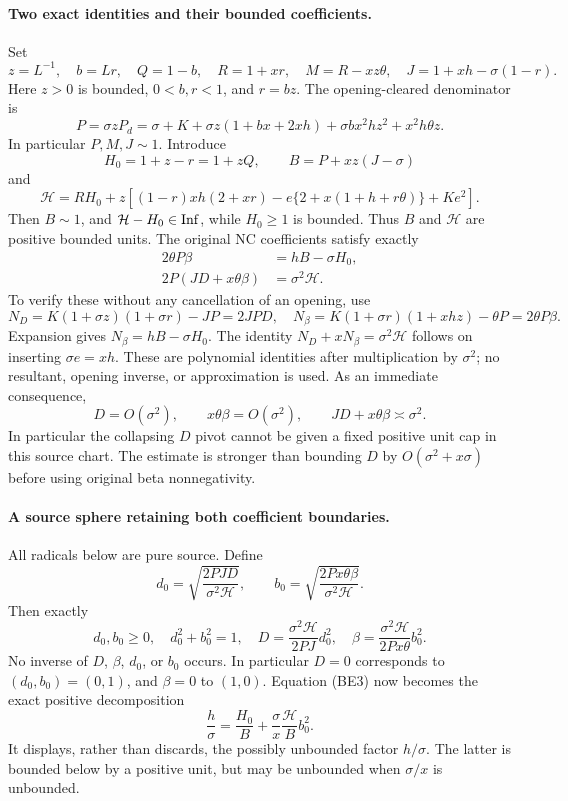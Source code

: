 \paragraph{Two exact identities and their bounded coefficients.}
Set
\[
 z=L^{-1},\quad b=Lr,\quad Q=1-b,\quad
 R=1+xr,\quad M=R-xz\theta,\quad J=1+xh-\sigma(1-r).
\]
Here $z>0$ is bounded, $0<b,r<1$, and $r=bz$.
The opening-cleared denominator is
\[
 P=\sigma zP_d
 =\sigma+K+\sigma z(1+bx+2xh)
   +\sigma bx^2hz^2+x^2h\theta z.
\]
In particular $P,M,J\sim1$. Introduce
\[
 H_0=1+z-r=1+zQ,\qquad B=P+xz(J-\sigma)
\]
and
\[
 \mathcal H=RH_0+z\left[(1-r)xh(2+xr)
 -e\{2+x(1+h+r\theta)\}+Ke^2\right].
 \tag{BE2}
\]
Then $B\sim1$, and $\mathcal H-H_0\in\operatorname{Inf}$, while $H_0\ge1$ is
bounded. Thus $B$ and $\mathcal H$ are positive bounded units.
The original NC coefficients satisfy exactly
\begin{align*}
 2\theta P\beta&=hB-\sigma H_0,                    \tag{BE3}\\
 2P(JD+x\theta\beta)&=\sigma^2\mathcal H.         \tag{BE4}
\end{align*}
To verify these without any cancellation of an opening, use
\[
 N_D=K(1+\sigma z)(1+\sigma r)-JP=2JPD,
 \quad
 N_\beta=K(1+\sigma r)(1+xhz)-\theta P=2\theta P\beta.
\]
Expansion gives $N_\beta=hB-\sigma H_0$. The identity
$N_D+xN_\beta=\sigma^2\mathcal H$ follows on inserting
$\sigma e=xh$. These are polynomial identities after multiplication
by $\sigma^2$; no resultant, opening inverse, or approximation is used.
As an immediate consequence,
\[
 D=O(\sigma^2),\qquad x\theta\beta=O(\sigma^2),\qquad
 JD+x\theta\beta\asymp\sigma^2.
 \tag{BE5}
\]
In particular the collapsing $D$ pivot cannot be given a fixed positive
unit cap in this source chart. The estimate is stronger than bounding
$D$ by $O(\sigma^2+x\sigma)$ before using original beta nonnegativity.

\paragraph{A source sphere retaining both coefficient boundaries.}
All radicals below are pure source. Define
\[
 d_0=\sqrt{\frac{2PJD}{\sigma^2\mathcal H}},\qquad
 b_0=\sqrt{\frac{2Px\theta\beta}{\sigma^2\mathcal H}}.
\]
Then exactly
\[
 d_0,b_0\ge0,\quad d_0^2+b_0^2=1,
 \quad D=\frac{\sigma^2\mathcal H}{2PJ}d_0^2,
 \quad \beta=\frac{\sigma^2\mathcal H}{2Px\theta}b_0^2.
 \tag{BE6}
\]
No inverse of $D$, $\beta$, $d_0$, or $b_0$ occurs. In particular
$D=0$ corresponds to $(d_0,b_0)=(0,1)$, and $\beta=0$ to $(1,0)$.
Equation (BE3) now becomes the exact positive decomposition
\[
 \frac h\sigma=\frac{H_0}{B}
       +\frac\sigma x\frac{\mathcal H}{B}b_0^2.
 \tag{BE7}
\]
It displays, rather than discards, the possibly unbounded factor
$h/\sigma$. The latter is bounded below by a positive unit, but may
be unbounded when $\sigma/x$ is unbounded.

